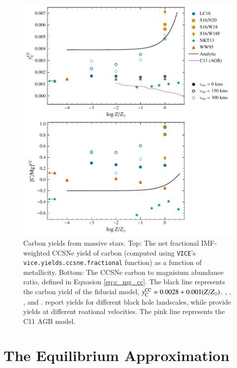 \documentclass[12pt,oneside]{report}
\newcommand{\VICE}{\texttt{VICE}}
\newcommand{\Ycc}{\ensuremath{y_{\rm C}^{\rm CC}}}
\begin{document}
\begin{figure}[htp]
    \centering
    \includegraphics{y_c_cc.pdf}
    \caption[CCSNe carbon yields]{
        Carbon yields from massive stars.
        Top: The net fractional IMF-weighted CCSNe yield of carbon (computed using \VICE's \texttt{vice.yields.ccsne.fractional} function) as a function of metallicity.
        Bottom: The CCSNe carbon to magnisium abundance ratio, defined in Equasion \ref{eq:c_mg_cc}. The black line represents the carbon yield of the fiducial model,
    $\Ycc = 0.0028 + 0.001 (Z/Z_{\odot})$. 
    \citet[red triangles]{WW95}, \citet[orange squares and diamonds]{sukhbold+16}, 
    \citet[green stars]{NKT13}, and \citet[blue circles]{LC18}. \citet{sukhbold+16} report yields for different black hole landscales, while \citet{LC18} provide yields at different roational velocities.
The pink line represents the C11 AGB model.
}
    \label{fig:y_cc}
\end{figure}

\chapter{The Equilibrium Approximation}\label{sec:equilibrium}
\end{document}
